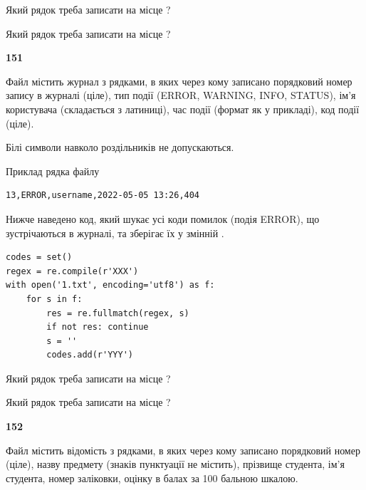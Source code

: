 Який рядок треба записати на місце  ?\par
\vspace{5mm}


Який рядок треба записати на місце  ?\par


\newpage

{\begin {center}\textbf{ 151}\end {center}}\par
Файл  містить журнал з рядками, в яких через кому записано поряд\-ко\-вий номер запису в журналі (ціле), тип події (ERROR, WARNING, INFO, STATUS), ім'я користувача (складається з латиниці), час події (фор\-мат як у прикладі), код події (ціле).

Білі символи навколо роздільників не допускаються.

Приклад рядка файлу



\begin{verbatim}
13,ERROR,username,2022-05-05 13:26,404
\end{verbatim}


Нижче наведено код, який шукає усі коди помилок (подія ERROR), що зустріча\-ють\-ся в журналі, та зберігає їх у змінній .



\begin{verbatim}
codes = set()
regex = re.compile(r'XXX')
with open('1.txt', encoding='utf8') as f:
    for s in f:
        res = re.fullmatch(regex, s)
        if not res: continue
        s = ''
        codes.add(r'YYY')
\end{verbatim}





Який рядок треба записати на місце  ?\par
\vspace{5mm}


Який рядок треба записати на місце  ?\par


\newpage

{\begin {center}\textbf{ 152}\end {center}}\par
Файл  містить відомість з рядками, в яких через кому записа\-но поряд\-ковий номер (ціле), назву предмету (знаків пунктуації не містить), прізвище студента, ім'я студента, номер заліковки, оцінку в балах за 100 бальною шкалою.

